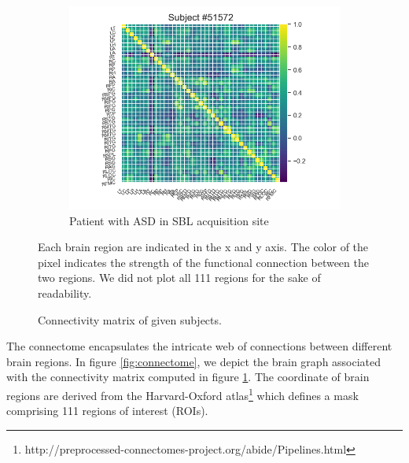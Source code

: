 \begin{figure}[h!]
    \hfill
    \begin{subfigure}{0.3\textwidth}
        \centering
        \includegraphics[width=\textwidth]{figures/ex_connectivity_matrix_sbl_ASD.png}
        \caption{\centering Patient with ASD in SBL acquisition site \qquad }
        \Description{}
    \end{subfigure}
    \caption{Connectivity matrix of given subjects.} Each brain region are indicated in the x and y axis. The color of the pixel indicates the strength of the functional connection between the two regions. We did not plot all 111 regions for the sake of readability.
    \Description{}
    \label{fig:connectivity_matrix}
\end{figure}

The connectome encapsulates the intricate web of connections between different brain regions. In figure \ref{fig:connectome}, we depict the brain graph associated with the connectivity matrix computed in figure \ref{fig:connectivity_matrix}. The coordinate of brain regions are derived from the Harvard-Oxford atlas\footnote{http://preprocessed-connectomes-project.org/abide/Pipelines.html} which defines a mask comprising 111 regions of interest (ROIs).

